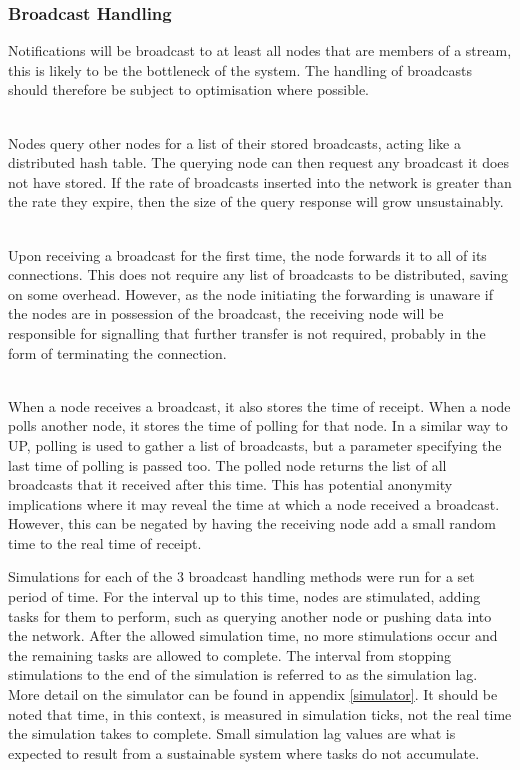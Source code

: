 			\subsubsection{Broadcast Handling}
			Notifications will be broadcast to at least all nodes that are members of a stream, this is likely to be the bottleneck of the system. The handling of broadcasts should therefore be subject to optimisation where possible.

			\begin{description}[topsep=-5pt,itemsep=-1ex,partopsep=2ex,parsep=1.5ex]
				\item[Universal Polling (UP)] \hfill \\
				Nodes query other nodes for a list of their stored broadcasts, acting like a distributed hash table. The querying node can then request any broadcast it does not have stored. If the rate of broadcasts inserted into the network is greater than the rate they expire, then the size of the query response will grow unsustainably.
				\item[Active Forwarding (AF)] \hfill \\
				Upon receiving a broadcast for the first time, the node forwards it to all of its connections. This does not require any list of broadcasts to be distributed, saving on some overhead. However, as the node initiating the forwarding is unaware if the nodes are in possession of the broadcast, the receiving node will be responsible for signalling that further transfer is not required, probably in the form of terminating the connection.
				\item[Selective Polling (SP)] \hfill \\
				When a node receives a broadcast, it also stores the time of receipt. When a node polls another node, it stores the time of polling for that node. In a similar way to UP, polling is used to gather a list of broadcasts, but a parameter specifying the last time of polling is passed too. The polled node returns the list of all broadcasts that it received after this time. This has potential anonymity implications where it may reveal the time at which a node received a broadcast. However, this can be negated by having the receiving node add a small random time to the real time of receipt.
			\end{description}
			
			Simulations for each of the 3 broadcast handling methods were run for a set period of time. For the interval up to this time, nodes are stimulated, adding tasks for them to perform, such as querying another node or pushing data into the network. After the allowed simulation time, no more stimulations occur and the remaining tasks are allowed to complete. The interval from stopping stimulations to the end of the simulation is referred to as the simulation lag. More detail on the simulator can be found in appendix \ref{simulator}. It should be noted that time, in this context, is measured in simulation ticks, not the real time the simulation takes to complete. Small simulation lag values are what is expected to result from a sustainable system where tasks do not accumulate.
			
